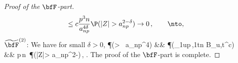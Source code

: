 \begin{proof}[Proof of the $\bfF$-part]
\begin{equation*}
\begin{split}
&\le c \frac{p^3 n}{a_{np}^{4 \delta}} \P(|Z|> a_{np}^{2-\delta}) \to 0\,,
\qquad \nto,
\end{split}
\end{equation*}
$\widetilde{\bfF}^{(2)}$: %
We have for small $\delta>0$,
\beao%
\P(> \epsilon\, a_{np}^4) &\le& 
\P\Big(\bigcup_{1\le u\le p\,,1\le t\le n} B_{u,t}^c\Big)\\
&\le & p\,n\, \P(|Z|> a_{np}^{2-\delta})\,,\qquad\,\nto\,.
\eeao
The proof of the $\bfF$-part is complete.
\end{proof}
